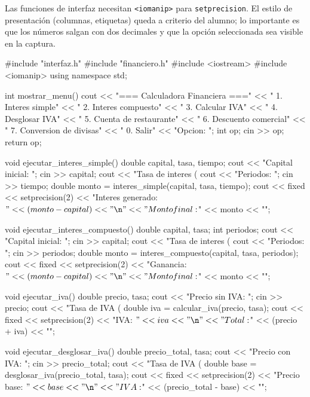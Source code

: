 \documentclass[12pt, oneside]{article}
\begin{document}
\begin{notaprofesor}
  Las funciones de interfaz necesitan \texttt{<iomanip>} para
  \texttt{setprecision}.  El estilo de presentación (columnas, etiquetas)
  queda a criterio del alumno; lo importante es que los números salgan
  con dos decimales y que la opción seleccionada sea visible en la captura.

\begin{codigo}
#include "interfaz.h"
#include "financiero.h"
#include <iostream>
#include <iomanip>
using namespace std;

int mostrar_menu() {
    cout << "\n=== Calculadora Financiera ===\n"
         << " 1. Interes simple\n"
         << " 2. Interes compuesto\n"
         << " 3. Calcular IVA\n"
         << " 4. Desglosar IVA\n"
         << " 5. Cuenta de restaurante\n"
         << " 6. Descuento comercial\n"
         << " 7. Conversion de divisas\n"
         << " 0. Salir\n"
         << "Opcion: ";
    int op;
    cin >> op;
    return op;
}

void ejecutar_interes_simple() {
    double capital, tasa, tiempo;
    cout << "Capital inicial:     "; cin >> capital;
    cout << "Tasa de interes (%
    cout << "Periodos:            "; cin >> tiempo;
    double monto = interes_simple(capital, tasa, tiempo);
    cout << fixed << setprecision(2)
         << "Interes generado: $" << (monto - capital) << "\n"
         << "Monto final:      $" << monto              << "\n";
}

void ejecutar_interes_compuesto() {
    double capital, tasa;
    int    periodos;
    cout << "Capital inicial:     "; cin >> capital;
    cout << "Tasa de interes (%
    cout << "Periodos:            "; cin >> periodos;
    double monto = interes_compuesto(capital, tasa, periodos);
    cout << fixed << setprecision(2)
         << "Ganancia:    $" << (monto - capital) << "\n"
         << "Monto final: $" << monto              << "\n";
}

void ejecutar_iva() {
    double precio, tasa;
    cout << "Precio sin IVA:  "; cin >> precio;
    cout << "Tasa de IVA (%
    double iva = calcular_iva(precio, tasa);
    cout << fixed << setprecision(2)
         << "IVA:   $" << iva             << "\n"
         << "Total: $" << (precio + iva)  << "\n";
}

void ejecutar_desglosar_iva() {
    double precio_total, tasa;
    cout << "Precio con IVA:  "; cin >> precio_total;
    cout << "Tasa de IVA (%
    double base = desglosar_iva(precio_total, tasa);
    cout << fixed << setprecision(2)
         << "Precio base: $" << base                     << "\n"
         << "IVA:         $" << (precio_total - base)    << "\n";
}


\end{codigo}
\end{notaprofesor}
\end{document}
